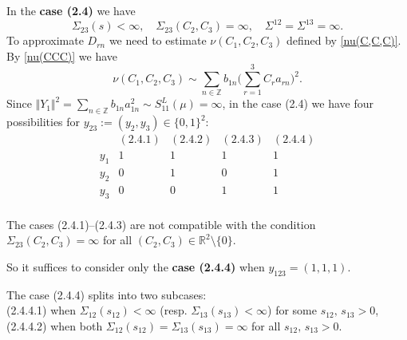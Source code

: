 \documentclass[preprint,12pt]{elsarticle}
\numberwithin{equation}{section}
\begin{document}
In the {\bf case (2.4)} we have  
\begin{equation}
 \label{(2.4)}
\Sigma_{23}(s)\!<\!\infty, \quad
 \Sigma_{23}(C_2,C_3)=\infty,\quad 
\Sigma^{12}=\Sigma^{13}=\infty.
\end{equation}
To approximate $D_{rn}$ we need to estimate $\nu( C_1, C_2, C_3)$  defined by \eqref{nu(C,C,C)}.
By \eqref{nu(CCC)} we have
\begin{equation*}
\nu( C_1, C_2, C_3)\sim\sum_{n\in \mathbb Z}b_{1n}\Big(\sum_{r=1}^3C_ra_{rn}\Big)^2.
\end{equation*}
Since $\Vert Y_1\Vert^2=\sum_{n\in \mathbb Z}
b_{1n}a^2_{1n}\sim S^L_{11}(\mu)
=\infty$, in the case (2.4) we have  four %
possibilities
for $y_{23}:=(y_2,y_3)\in \{0,1\}^2$:
%
$$
\begin{array}{ccccc}
   &(2.4.1)&(2.4.2)&(2.4.3)&(2.4.4)\\
y_1&1&1&1&1\\
y_2&0&1&0&1\\
y_3&0&0&1&1\\
\end{array}
$$
\begin{rem}
The cases (2.4.1)--(2.4.3) are not compatible with the condition 
$ \Sigma_{23}(C_2,C_3)=\infty$ for all $(C_2,C_3)\in{\mathbb R}^2\setminus\{0\}$.
\end{rem}
%
So it suffices to consider only the   {\bf case (2.4.4)} when  $y_{123}=(1,1,1)$.


The case (2.4.4) splits into two subcases:\\
(2.4.4.1) when $\Sigma_{12}(s_{12})\!<\!\infty$ (resp. $\Sigma_{13}(s_{13})\!<\!\infty$) for some $s_{12},\,s_{13}>0$,\\
(2.4.4.2) when both  $\Sigma_{12}(s_{12})\!=\!\Sigma_{13}(s_{13})=\infty$ for all $s_{12},\,s_{13}>0$.
\end{document}
